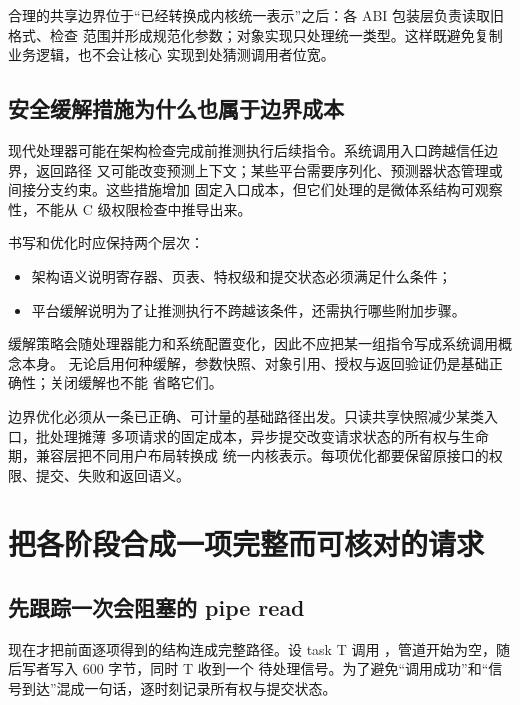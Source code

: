 合理的共享边界位于“已经转换成内核统一表示”之后：各 ABI 包装层负责读取旧格式、检查
范围并形成规范化参数；对象实现只处理统一类型。这样既避免复制业务逻辑，也不会让核心
实现到处猜测调用者位宽。

\subsection{安全缓解措施为什么也属于边界成本}

现代处理器可能在架构检查完成前推测执行后续指令。系统调用入口跨越信任边界，返回路径
又可能改变预测上下文；某些平台需要序列化、预测器状态管理或间接分支约束。这些措施增加
固定入口成本，但它们处理的是微体系结构可观察性，不能从 C 级权限检查中推导出来。

书写和优化时应保持两个层次：

\begin{itemize}
\tightlist
\item 架构语义说明寄存器、页表、特权级和提交状态必须满足什么条件；
\item 平台缓解说明为了让推测执行不跨越该条件，还需执行哪些附加步骤。
\end{itemize}

缓解策略会随处理器能力和系统配置变化，因此不应把某一组指令写成系统调用概念本身。
无论启用何种缓解，参数快照、对象引用、授权与返回验证仍是基础正确性；关闭缓解也不能
省略它们。

\begin{keyidea}
边界优化必须从一条已正确、可计量的基础路径出发。只读共享快照减少某类入口，批处理摊薄
多项请求的固定成本，异步提交改变请求状态的所有权与生命期，兼容层把不同用户布局转换成
统一内核表示。每项优化都要保留原接口的权限、提交、失败和返回语义。
\end{keyidea}

\section{把各阶段合成一项完整而可核对的请求}

\subsection{先跟踪一次会阻塞的 pipe read}

现在才把前面逐项得到的结构连成完整路径。设 task T 调用
，管道开始为空，随后写者写入 600 字节，同时 T 收到一个
待处理信号。为了避免“调用成功”和“信号到达”混成一句话，逐时刻记录所有权与提交状态。

